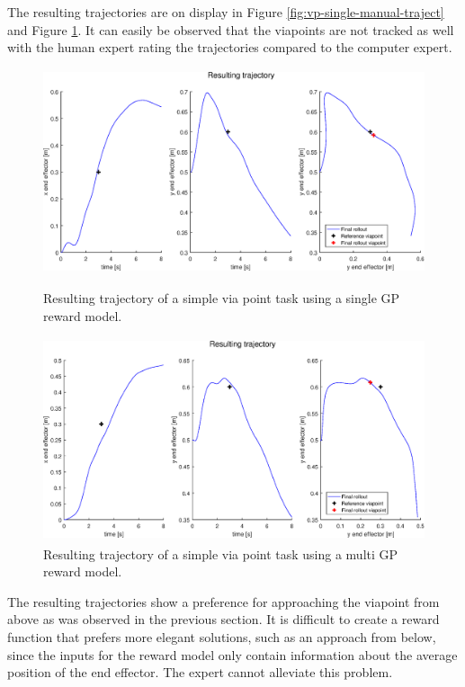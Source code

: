 \documentclass[mscThesis.tex]{subfiles}
\begin{document}
The resulting trajectories are on display in Figure \ref{fig:vp-single-manual-traject} and Figure \ref{fig:vp-multi-manual-traject}. It can easily be observed that the viapoints are not tracked as well with the human expert rating the trajectories compared to the computer expert. 

\begin{figure}[!htb]
    \begin{minipage}[b]{\linewidth}
        \centering
        \includegraphics[width=\textwidth, height = 6cm]{figures/results/viapoint/trajectory_single_manual.eps}
        \caption{Resulting trajectory of a simple via point task using a single GP reward model.}
        \label{fig:vp-single-manual-traject}
        \vspace{4ex}
    \end{minipage}%
    
    \begin{minipage}[b]{\linewidth}
        \centering
        \includegraphics[width=\textwidth, height = 6cm]{figures/results/viapoint/trajectory_multi_manual.eps}
        \caption{Resulting trajectory of a simple via point task using a multi GP reward model.}
        \label{fig:vp-multi-manual-traject}
    \end{minipage}%
\end{figure}

The resulting trajectories show a preference for approaching the viapoint from above as was observed in the previous section. It is difficult to create a reward function that prefers more elegant solutions, such as an approach from below, since the inputs for the reward model only contain information about the average position of the end effector. The expert cannot alleviate this problem.
\end{document}
